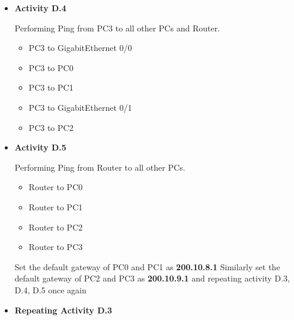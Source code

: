 \documentclass[12pt]{article}
\begin{document}
\begin{itemize}
      \item \textbf{Activity D.4}

            Performing Ping from PC3 to all other PCs and Router.
            \begin{itemize}
                  \item PC3 to GigabitEthernet 0/0
                  \item PC3 to PC0
                  \item PC3 to PC1
                  \item PC3 to GigabitEthernet 0/1
                  \item PC3 to PC2
            \end{itemize}


      \item \textbf{Activity D.5}

            Performing Ping from Router to all other PCs.
            \begin{itemize}
                  \item Router to PC0
                  \item Router to PC1
                  \item Router to PC2
                  \item Router to PC3
            \end{itemize}

            \HRule

            {\large Set the default gateway of PC0 and PC1 as \textbf{200.10.8.1} Similarly set the default gateway of PC2 and PC3 as \textbf{200.10.9.1 }and repeating activity D.3, D.4, D.5 once again }

            \HRule
      \item \textbf{Repeating Activity D.3}


\end{itemize}
\end{document}
